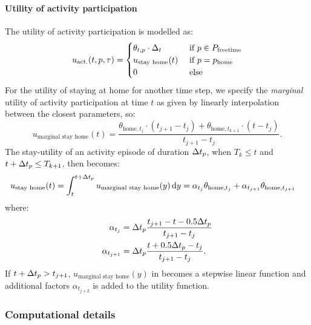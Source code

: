 \paragraph{Utility of activity participation}
The utility of activity participation is modelled as:
\begin{equation}
	\uact(t,p,\atime) = \begin{cases} 
	\theta_{t,p} \cdot \Delta_t &\cif p \in P_{\text{freetime}} \\
	u_\text{stay home}(t) & \cif p = p_\text{home} \\
	0 & \celse
	\end{cases}
\end{equation}
\newcommand{\home}{\text{home}}
 For the utility of staying at home for another time step, we specify the \emph{marginal} utility of activity participation at time $t$ as given by linearly interpolation between the closest parameters, so:
\begin{equation*}
u_\text{marginal stay home}(t) = \frac{\theta_{\home,t_j}\cdot(t_{j+1}-t_j)+\theta_{\home,t_{k+1}}\cdot(t-t_j) }{t_{j+1}-t_{j}}.
\end{equation*}
The stay-utility of an activity episode of duration $\Delta t_p$, when $T_k\leq t$ and $t+\Delta t_p\leq T_{k+1}$, then becomes:
\begin{equation} \label{eq:uacttime}
\begin{aligned}
u_\text{stay home}(t) &= \int_t^{t+\dura{p}} u_\text{marginal stay home}(y)
\ud{y} = \alpha_{t_j}\theta_{\home,t_j} + \alpha_{t_{j+1}}\theta_{\home,t_{j+1}}%
\end{aligned}
\end{equation}
where:
\begin{align*}
\alpha_{t_j}&=\dura{p}\frac{t_{j+1} - t - 0.5 \dura{p}}{t_{j+1}-t_{j}}\\
\alpha_{t_{j+1}}&=\dura{p}\frac{t + 0.5\dura{p} - t_j}{t_{j+1}-t_{j}}.
\end{align*}
If $t+\Delta t_p> t_{j+1}$, $u_\text{marginal stay home}(y)$ in  becomes a stepwise linear function and additional factors $\alpha_{t_{j+2}}$ is added to the utility function.

\subsubsection{Computational details}
\label{seq:computationTime}

